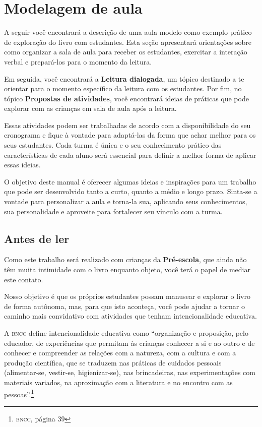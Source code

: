\documentclass[11pt]{extarticle}
\begin{document}
{{\section{Modelagem de aula}
A seguir você encontrará a descrição de uma aula modelo como exemplo 
prático de exploração do livro com estudantes. Esta seção apresentará 
orientações sobre como organizar a sala de aula para receber os 
estudantes, exercitar a interação verbal e prepará-los para o 
momento da leitura.

Em seguida, você encontrará a \textbf{Leitura dialogada}, um 
tópico destinado a te orientar para o momento específico da 
leitura com os estudantes. Por fim, no tópico 
\textbf{Propostas de atividades}, você encontrará ideias 
de práticas que pode explorar com as crianças em sala de 
aula após a leitura. 

Essas atividades podem ser trabalhadas de acordo com a 
disponibilidade do seu cronograma e fique à vontade para adaptá-las 
da forma que achar melhor para os seus estudantes. Cada turma é única 
e o seu conhecimento prático das características de cada aluno será 
essencial para definir a melhor forma de aplicar essas ideias. 

O objetivo deste manual é oferecer algumas ideias 
e inspirações para um trabalho que pode ser desenvolvido tanto 
a curto, quanto a médio e longo prazo. Sinta-se a vontade para 
personalizar a aula e torna-la sua, aplicando seus conhecimentos, sua 
personalidade e aproveite para fortalecer 
seu vínculo com a turma.


\subsection{Antes de ler}


Como este trabalho será realizado com crianças da \textbf{Pré-escola}, 
que ainda não têm muita intimidade com o livro enquanto objeto, você terá o 
papel de mediar este contato. 

Nosso objetivo é que os próprios estudantes possam manusear 
e explorar o livro de forma autônoma, mas, para que isto aconteça, você 
pode ajudar a tornar o caminho mais convidativo com atividades que tenham 
intencionalidade educativa. 

A \textsc{bncc} define intencionalidade educativa como ``organização 
e proposição, pelo educador, de experiências que permitam às crianças 
conhecer a si e ao outro e de conhecer e compreender as relações com a 
natureza, com a cultura e com a produção científica, que se traduzem nas 
práticas de cuidados pessoais (alimentar-se, vestir-se, higienizar-se), 
nas brincadeiras, nas experimentações com materiais 
variados, na aproximação com a literatura e no encontro com as 
pessoas''.\footnote{\textsc{bncc}, página 39}

}}
\end{document}
